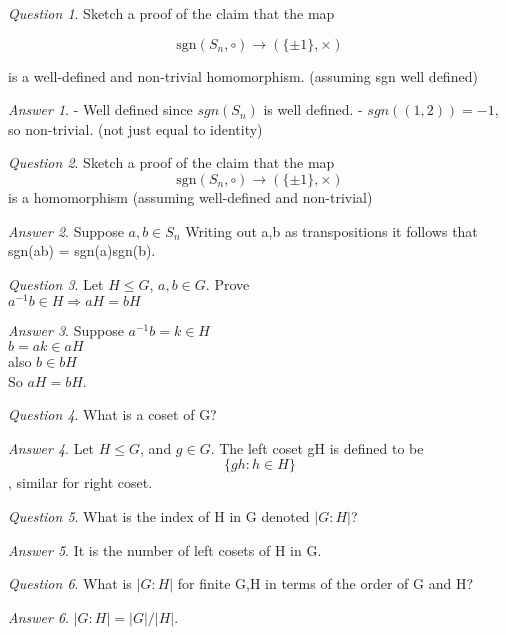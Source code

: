 \documentclass[]{article}
\theoremstyle{remark}
\theoremstyle{qnstyle}
\newtheorem{question}{Question}
\theoremstyle{answerstyle}
\newtheorem*{answer}{Answer}
\begin{document}
\begin{question}
    Sketch a proof of the claim that the map

        $$\text{sgn}(S_n, \circ) \to (\{ \pm 1\}, \times)$$

    is a well-defined and non-trivial homomorphism. (assuming sgn well defined)
\end{question}
\begin{answer}
    - Well defined since $sgn(S_n)$ is well defined.
    - $sgn((1,2)) = -1$, so non-trivial. (not just equal to identity)
\end{answer}

\begin{question}
    Sketch a proof of the claim that the map
    $$\text{sgn}(S_n, \circ) \to (\{ \pm 1\}, \times)$$
    is a homomorphism (assuming well-defined and non-trivial)
\end{question}
\begin{answer}
    Suppose $a,b \in S_n$
    Writing out a,b as transpositions it follows that sgn(ab) = sgn(a)sgn(b).
\end{answer}

\begin{question}
    Let $H \leq G$, $a,b \in G$. Prove\\
    $a^{-1}b \in H \Rightarrow aH = bH$
\end{question}
\begin{answer}
    Suppose $a^{-1}b = k \in H$\\
    $b = ak \in aH$\\
    also $b \in bH$\\
    So $aH = bH$.
\end{answer}

\begin{question}
    What is a coset of G?
\end{question}
\begin{answer}
    Let $H \leq G$, and $g \in G$. The left coset gH is defined to be
    $$\{gh: h \in H\}$$, similar for right coset.
\end{answer}


\begin{question}
    What is the index of H in G denoted $\vert G:H \vert$?
\end{question}
\begin{answer}
    It is the number of left cosets of H in G.
\end{answer}

\begin{question}
    What is $|G:H|$ for finite G,H in terms of the order of G and H?
\end{question}
\begin{answer}
    $|G:H| = |G|/|H|$.
\end{answer}
\end{document}
